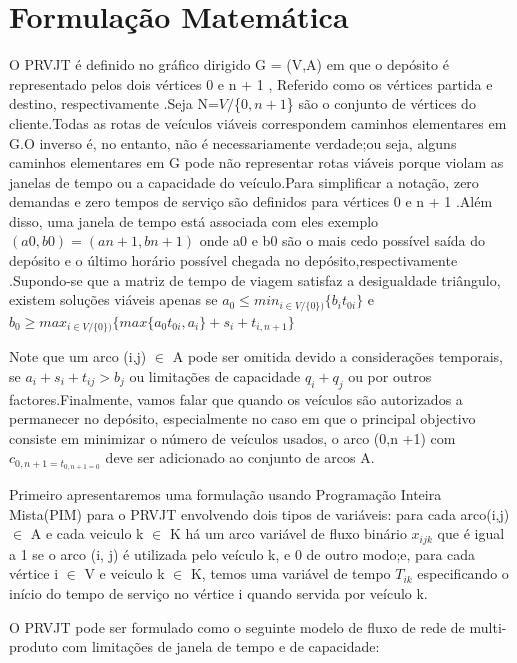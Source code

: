 \section{Formulação Matemática}



O PRVJT é definido no gráfico dirigido G = (V,A) em que o depósito é representado pelos dois vértices 0 e n + 1 , Referido como os vértices partida e destino, respectivamente .Seja N=$V/$\{$0,n+1$\} são o conjunto de vértices do cliente.Todas as rotas de veículos viáveis correspondem caminhos elementares em G.O inverso é, no entanto, não é necessariamente verdade;ou seja, alguns caminhos elementares em G pode não representar rotas viáveis porque violam as janelas de tempo ou a capacidade do veículo.Para simplificar a notação, zero demandas e zero tempos de serviço são definidos para vértices 0 e n + 1 .Além disso, uma janela de tempo está associada com eles exemplo $(a0, b0) = (an+1, bn+1)$ onde a0 e b0 são o mais cedo possível saída do depósito e o último horário possível chegada no depósito,respectivamente .Supondo-se que a matriz de tempo de viagem satisfaz a desigualdade triângulo, existem soluções viáveis apenas se $a_0 \leq min_{i \in V/\{0\})} \{b_i t_{0i}\} $ e $ b_0 \geq max_{i \in V/\{0\})} \{max\{a_0 t_{0i},a_i\}+s_i + t_{i,n+1} \}$




Note que um arco (i,j) $\in$ A pode ser omitida devido a considerações temporais, se $ a_i + s_i + t_{ij} > b_j$ ou limitações de capacidade $ q_i +q_j $ ou por outros factores.Finalmente, vamos falar que quando os veículos são autorizados a permanecer no depósito, especialmente no caso em que o principal objectivo consiste em minimizar o número de veículos usados, o arco (0,n +1) com $c_{0,n+1 = t_{0,n+1 = 0}} $ deve ser adicionado ao conjunto de arcos A.



Primeiro apresentaremos uma formulação usando Programação Inteira Mista(PIM) para o PRVJT envolvendo dois tipos de variáveis: para cada arco(i,j)$\in$ A e cada veiculo k $\in$ K há um arco variável de fluxo binário $x_{ijk}$ que é igual a 1 se o arco (i, j) é utilizada pelo veículo k, e 0 de outro modo;e, para cada vértice i $\in$ V e veiculo k $\in$ K, temos uma variável de tempo $T_{ik}$ especificando o início do tempo de serviço no vértice i quando servida por veículo k.


O PRVJT pode ser formulado como o seguinte modelo de fluxo de rede de multi-produto com limitações de janela de tempo e de capacidade:

